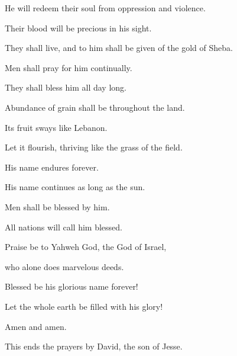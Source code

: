 {\par }{\Q {}He will redeem their soul from oppression and violence.
\par }{\QB Their blood will be precious in his sight.
\par }{\Q {}They shall live, and to him shall be given of the gold of Sheba.
\par }{\QB Men shall pray for him continually.
\par }{\QB They shall bless him all day long.
\par }{\Q {}Abundance of grain shall be throughout the land.
\par }{\QB Its fruit sways like Lebanon.
\par }{\QB Let it flourish, thriving like the grass of the field.
\par }{\Q {}His name endures forever.
\par }{\QB His name continues as long as the sun.
\par }{\Q Men shall be blessed by him.
\par }{\QB All nations will call him blessed.
\par }{\BB \par }{\Q {}Praise be to Yahweh God, the God of Israel,
\par }{\QB who alone does marvelous deeds.
\par }{\Q {}Blessed be his glorious name forever!
\par }{\QB Let the whole earth be filled with his glory!
\par }{\Q Amen and amen.
\par }{\BB \par }{\PP {}This ends the prayers by David, the son of Jesse.

}
